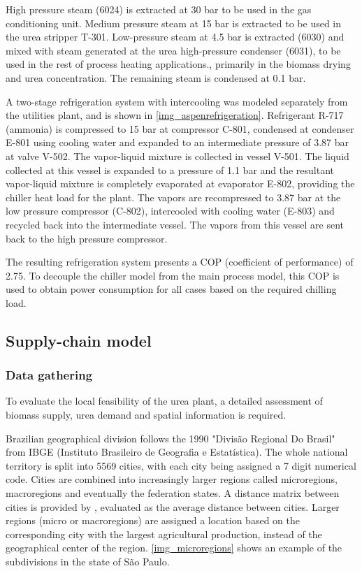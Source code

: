 \documentclass[a4paper, titlepage]{article}
\begin{document}
High pressure steam (6024) is extracted at 30 bar to be used in the gas conditioning unit. Medium pressure steam at
15 bar is extracted to be used in the urea stripper T-301. Low-pressure steam at 4.5 bar is extracted (6030) and mixed
with steam generated at the urea high-pressure condenser (6031), to be used in the rest of process heating
applications., primarily in the biomass drying and urea concentration. The remaining steam is condensed at 0.1 bar.

A two-stage refrigeration system with intercooling was modeled separately from the utilities plant, and is shown in
\autoref{img_aspenrefrigeration}. Refrigerant R-717 (ammonia) is compressed to 15 bar at compressor C-801, condensed at
condenser E-801 using cooling water and expanded to an intermediate pressure of 3.87 bar at valve V-502. The
vapor-liquid mixture is collected in vessel V-501. The liquid collected at this vessel is expanded to a pressure of 1.1
bar and the resultant vapor-liquid mixture is completely evaporated at evaporator E-802, providing the chiller heat load
for the plant. The vapors are recompressed to 3.87 bar at the low pressure compressor (C-802), intercooled with cooling
water (E-803) and recycled back into the intermediate vessel. The vapors from this vessel are sent back to the high
pressure compressor.

The resulting refrigeration system presents a COP (coefficient of performance) of 2.75. To decouple the chiller model
from the main process model, this COP is used to obtain power consumption for all cases based on the required chilling
load.


\subsection{Supply-chain model}

\subsubsection{Data gathering}

To evaluate the local feasibility of the urea plant, a detailed assessment of biomass supply, urea demand and spatial
information is required.

Brazilian geographical division follows the 1990 "Divisão Regional Do Brasil" from IBGE (Instituto Brasileiro de
Geografia e Estatística). The whole national territory is split into 5569 cities, with each city being assigned a 7 digit
numerical code. Cities are combined into increasingly larger regions called
microregions, macroregions and eventually the federation states. A distance matrix between cities is provided by
\textcite{carvalhoMatrizesDistanciasTempo2021}, evaluated as the average distance between cities. Larger regions
(micro or macroregions) are assigned a location based on the corresponding city with the largest agricultural production,
instead of the geographical center of the region. \autoref{img_microregions} shows an example of the subdivisions in
the state of São Paulo.
\end{document}

